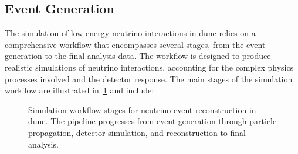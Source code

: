 \subsection{Event Generation}\label{sec:NEUTRINO_GENERATION}
The simulation of low-energy neutrino interactions in \gls{dune} relies on a comprehensive workflow that encompasses several stages, from the event generation to the final analysis data. The workflow is designed to produce realistic simulations of neutrino interactions, accounting for the complex physics processes involved and the detector response. The main stages of the simulation workflow are illustrated in~\cref{fig:SIM_WORKFLOW} and include:

\begin{figure}[ht!]
  \centering
  \caption{Simulation workflow stages for neutrino event reconstruction in \gls{dune}. The pipeline progresses from event generation through particle propagation, detector simulation, and reconstruction to final analysis.\label{fig:SIM_WORKFLOW}}
\end{figure}

